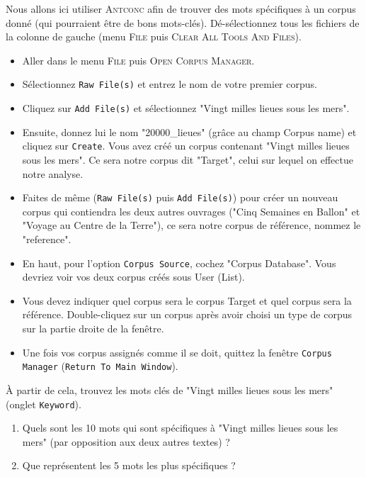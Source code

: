 \vspace{.2cm}
\vspace{.2cm}

Nous allons ici utiliser \textsc{Antconc} afin de trouver des mots spécifiques à un corpus donné (qui pourraient être de bons mots-clés).
Dé-sélectionnez tous les fichiers de la colonne de gauche (menu \textsc{File} puis \textsc{Clear All Tools And Files}).

\begin{itemize}
    \item Aller dans le menu \textsc{File} puis \textsc{Open Corpus Manager}.
	\item Sélectionnez \texttt{Raw File(s)} et entrez le nom de votre premier corpus.
	\item Cliquez sur \texttt{Add File(s)} et sélectionnez "Vingt milles lieues sous les mers".
	\item Ensuite, donnez lui le nom "20000\_lieues" (grâce au champ Corpus name) et cliquez sur \texttt{Create}. Vous avez créé un corpus contenant "Vingt milles lieues sous les mers". Ce sera notre corpus dit "Target", celui sur lequel on effectue notre analyse. 
	\item Faites de même (\texttt{Raw File(s)} puis \texttt{Add File(s)}) pour créer un nouveau corpus qui contiendra les deux autres ouvrages ("Cinq Semaines en Ballon" et "Voyage au Centre de la Terre"), ce sera notre corpus de référence, nommez le "reference". 
	\item En haut, pour l'option \texttt{Corpus Source}, cochez "Corpus Database". Vous devriez voir vos deux corpus créés sous User (List).
	\item Vous devez indiquer quel corpus sera le corpus Target et quel corpus sera la référence. Double-cliquez sur un corpus après avoir choisi un type de corpus sur la partie droite de la fenêtre.
	\item Une fois vos corpus assignés comme il se doit, quittez la fenêtre \texttt{Corpus Manager} (\texttt{Return To Main Window}).
\end{itemize}

À partir de cela, trouvez les mots clés de "Vingt milles lieues sous les mers" (onglet \texttt{Keyword}).

\begin{enumerate}
    \item Quels sont les 10 mots qui sont spécifiques à "Vingt milles lieues sous les mers" (par opposition aux deux autres textes) ?
    \item Que représentent les 5 mots les plus spécifiques ?
\end{enumerate}
\vspace{.5cm}
\vspace{.5cm}


